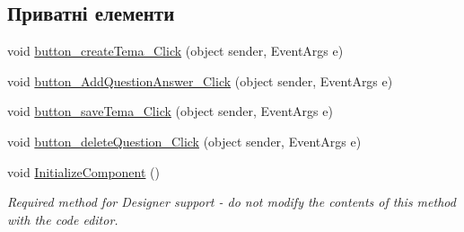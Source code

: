 \subsection*{Приватні елементи}
\begin{DoxyCompactItemize}
\item 
void \hyperlink{class_tests_1_1_adminka_a4201ca9bd4ac62e04d9c78dea1d28d6a}{button\+\_\+create\+Tema\+\_\+\+Click} (object sender, Event\+Args e)
\item 
void \hyperlink{class_tests_1_1_adminka_a74fd18bdc1977e716dbbfd8731d4bac4}{button\+\_\+\+Add\+Question\+Answer\+\_\+\+Click} (object sender, Event\+Args e)
\item 
void \hyperlink{class_tests_1_1_adminka_a997dd067679209e51d7388b408a9b8e8}{button\+\_\+save\+Tema\+\_\+\+Click} (object sender, Event\+Args e)
\item 
void \hyperlink{class_tests_1_1_adminka_a68c3719cadde4c89a1c3c949de576e9a}{button\+\_\+delete\+Question\+\_\+\+Click} (object sender, Event\+Args e)
\item 
void \hyperlink{class_tests_1_1_adminka_a717ad362ec305b9b4d9781dc509b9d3b}{Initialize\+Component} ()
\begin{DoxyCompactList}\small\item\em Required method for Designer support -\/ do not modify the contents of this method with the code editor. \end{DoxyCompactList}\end{DoxyCompactItemize}
